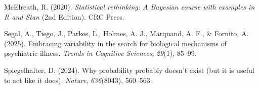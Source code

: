 \documentclass[
  italian,
  letterpaper,
  a4paper,
  11pt,
  open=any]{scrbook}
\newlength{\cslhangindent}
\newenvironment{CSLReferences}[2] %
 {\begin{list}{}{%
  \setlength{\itemindent}{0pt}
  \setlength{\leftmargin}{0pt}
  \setlength{\parsep}{0pt}
  \ifodd #1
   \setlength{\leftmargin}{\cslhangindent}
   \setlength{\itemindent}{-1\cslhangindent}
  \fi
  \setlength{\itemsep}{#2\baselineskip}}}
 {\end{list}}
\theoremstyle{plain}
\theoremstyle{definition}
\theoremstyle{definition}
\theoremstyle{remark}
\begin{document}
\begin{CSLReferences}{1}{0}
McElreath, R. (2020). \emph{Statistical rethinking: {A} {Bayesian}
course with examples in {R} and {Stan}} (2nd Edition). CRC Press.

Segal, A., Tiego, J., Parkes, L., Holmes, A. J., Marquand, A. F., \&
Fornito, A. (2025). Embracing variability in the search for biological
mechanisms of psychiatric illness. \emph{Trends in Cognitive Sciences},
\emph{29}(1), 85--99.

Spiegelhalter, D. (2024). Why probability probably doesn't exist (but it
is useful to act like it does). \emph{Nature}, \emph{636}(8043),
560--563.

\end{CSLReferences}


\backmatter
\end{document}
